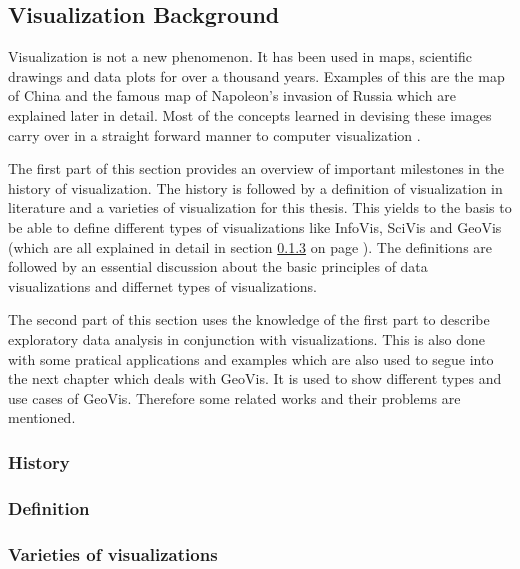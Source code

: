 \subsection{Visualization Background}
Visualization is not a new phenomenon. It has been used in maps, scientific drawings and data plots for over a thousand years. Examples of this are the map of China and the famous map of Napoleon's invasion of Russia which are explained later in detail. Most of the concepts learned in devising these images carry over in a straight forward manner to computer visualization .

The first part of this section provides an overview of important milestones in the history of visualization. The history is followed by a definition of visualization in literature and a varieties of visualization for this thesis. This yields to the basis to be able to define different types of visualizations like \ac{InfoVis}, \ac{SciVis} and \ac{GeoVis} (which are all explained in detail in section \ref{s:definitions-types} on page \pageref{s:definitions-types}). The definitions are followed by an essential discussion about the basic principles of data visualizations and differnet types of visualizations.

The second part of this section uses the knowledge of the first part to describe exploratory data analysis in conjunction with visualizations. This is also done with some pratical applications and examples which are also used to segue into the next chapter which deals with \ac{GeoVis}. It is used to show different types and use cases of \ac{GeoVis}. Therefore some related works and their problems are mentioned.

\subsubsection{History}
\label{s:history}


\subsubsection{Definition}
\label{s:definition}


\subsubsection{Varieties of visualizations}
\label{s:definitions-types}


